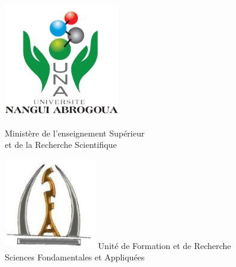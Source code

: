 	\let\cleardoublepage\clearpage

\begin{spacing}{0.85}
	\sf
	\begin{center}
		\begin{minipage}{0.3\textwidth}
			\begin{center}
			\end{center}
		\end{minipage}
	\end{center}
	
	\begin{minipage}{1\textwidth}
		\begin{minipage}{0.3\textwidth}
			\centering
			\begin{center}
				\begin{flushleft} 
				\end{flushleft}
			\end{center}\includegraphics[width=5cm]{UNA}
		\end{minipage}
		\hfill
		\begin{minipage}{0.3\textwidth}
			\begin{center}
				{\selectfont%
					Ministère de l'enseignement Supérieur\\
					et de la Recherche Scientifique
				}
			\end{center}
		\end{minipage}
		\hfill
		\begin{minipage}{0.3\textwidth}
			\centering
			\includegraphics[width=4cm]{SFA.PNG}
			{\selectfont%
				Unité de Formation et de Recherche\\ 
				Sciences Fondamentales et Appliquées
			}
		\end{minipage}
	\end{minipage}
	

\end{spacing}
